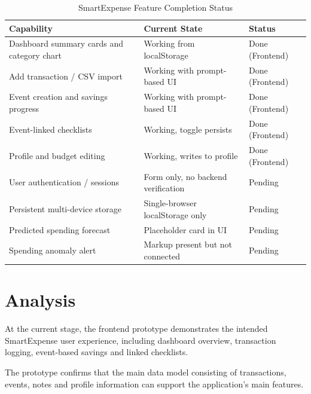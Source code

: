 \documentclass[12pt,a4paper]{report}
\begin{document}
\begin{table}[H]
\centering
\caption{SmartExpense Feature Completion Status}
\label{tab:features}

\renewcommand{\arraystretch}{1.4}

\begin{tabular}{|p{5cm}|p{5cm}|p{3cm}|}
\hline
\textbf{Capability} & \textbf{Current State} & \textbf{Status} \\
\hline

Dashboard summary cards and category chart &
Working from localStorage &
Done (Frontend) \\
\hline

Add transaction / CSV import &
Working with prompt-based UI &
Done (Frontend) \\
\hline

Event creation and savings progress &
Working with prompt-based UI &
Done (Frontend) \\
\hline

Event-linked checklists &
Working, toggle persists &
Done (Frontend) \\
\hline

Profile and budget editing &
Working, writes to profile &
Done (Frontend) \\
\hline

User authentication / sessions &
Form only, no backend verification &
Pending \\
\hline

Persistent multi-device storage &
Single-browser localStorage only &
Pending \\
\hline

Predicted spending forecast &
Placeholder card in UI &
Pending \\
\hline

Spending anomaly alert &
Markup present but not connected &
Pending \\
\hline

\end{tabular}
\end{table}


\section{Analysis}

At the current stage, the frontend prototype demonstrates the intended
SmartExpense user experience, including dashboard overview, transaction
logging, event-based savings and linked checklists.

The prototype confirms that the main data model consisting of transactions,
events, notes and profile information can support the application's main
features.
\end{document}
